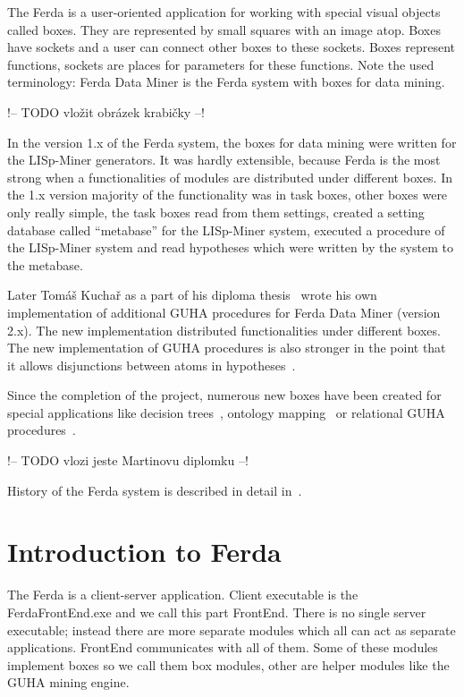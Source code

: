 \documentclass[a4paper,12pt]{book}
\begin{document}
The Ferda is a user-oriented application for working with special visual objects called boxes. They are represented by small squares with an image atop. Boxes have sockets and a user can connect other boxes to these sockets. Boxes represent functions, sockets are places for parameters for these functions. Note the used terminology: Ferda Data Miner is the Ferda system with boxes for data mining.

!-- TODO vložit obrázek krabičky --!

In the version 1.x of the Ferda system, the boxes for data mining were written for the LISp-Miner generators. It was hardly extensible, because Ferda is the most strong when a functionalities of modules are distributed under different boxes. In the 1.x version majority of the functionality was in task boxes, other boxes were only really simple, the task boxes read from them settings, created a setting database called ``metabase'' for the LISp-Miner system, executed a procedure of the LISp-Miner system and read hypotheses which were written by the system to the metabase.

Later Tomáš Kuchař as a part of his diploma thesis~\cite{thesisKuchar} wrote his own implementation of additional GUHA procedures for Ferda Data Miner (version 2.x). The new implementation distributed functionalities under different boxes. The new implementation of GUHA procedures is also stronger in the point that it allows disjunctions between atoms in hypotheses~\cite{RalbovskyDisjunction}.

Since the completion of the project, numerous new boxes have been created for special applications like decision trees~\cite{GUHAtrees}, ontology mapping~\cite{thesisZeman} or relational GUHA procedures~\cite{thesisKuzmin}. 

!-- TODO vlozi jeste Martinovu diplomku --!

History of the Ferda system is described in detail in~\cite{RalbovskyHistory}.

\section{Introduction to Ferda}
The Ferda is a client-server application. Client executable is the FerdaFrontEnd.exe and we call this part FrontEnd. There is no single server executable; instead there are more separate modules which all can act as separate applications. FrontEnd communicates with all of them. Some of these modules implement boxes so we call them box modules, other are helper modules like the GUHA mining engine.
\end{document}

